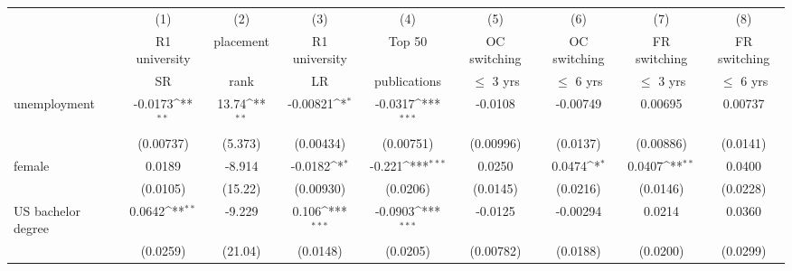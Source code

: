 \begin{table}[htbp]\centering
		\def\sym#1{\ifmmode^{#1}\else\(^{#1}\)\fi}
	\begin{adjustbox}{max width=1\textwidth}
\begin{tabular}{l*{8}{c}}
\hline\hline
            &\multicolumn{1}{c}{(1)}&\multicolumn{1}{c}{(2)}&\multicolumn{1}{c}{(3)}&\multicolumn{1}{c}{(4)}&\multicolumn{1}{c}{(5)}&\multicolumn{1}{c}{(6)}&\multicolumn{1}{c}{(7)}&\multicolumn{1}{c}{(8)}\\
            &\multicolumn{1}{c}{R1 university}&\multicolumn{1}{c}{placement}&\multicolumn{1}{c}{R1 university}&\multicolumn{1}{c}{Top 50}&\multicolumn{1}{c}{OC switching}&\multicolumn{1}{c}{OC switching}&\multicolumn{1}{c}{FR switching}&\multicolumn{1}{c}{FR switching}\\
            &\multicolumn{1}{c}{SR}&\multicolumn{1}{c}{rank}&\multicolumn{1}{c}{LR}&\multicolumn{1}{c}{publications}&\multicolumn{1}{c}{$\le$ 3 yrs}&\multicolumn{1}{c}{$\le$ 6 yrs}&\multicolumn{1}{c}{$\le$ 3 yrs}&\multicolumn{1}{c}{$\le$ 6 yrs}\\
\hline
unemployment    &     -0.0173\sym{**} &       13.74\sym{**} &    -0.00821\sym{*}  &     -0.0317\sym{***}&     -0.0108         &    -0.00749         &     0.00695         &     0.00737         \\
            &   (0.00737)         &     (5.373)         &   (0.00434)         &   (0.00751)         &   (0.00996)         &    (0.0137)         &   (0.00886)         &    (0.0141)         \\
[1em]
female &      0.0189         &      -8.914         &     -0.0182\sym{*}  &      -0.221\sym{***}&      0.0250         &      0.0474\sym{*}  &      0.0407\sym{**} &      0.0400         \\
            &    (0.0105)         &     (15.22)         &   (0.00930)         &    (0.0206)         &    (0.0145)         &    (0.0216)         &    (0.0146)         &    (0.0228)         \\
[1em]
US bachelor degree   &      0.0642\sym{**} &      -9.229         &       0.106\sym{***}&     -0.0903\sym{***}&     -0.0125         &    -0.00294         &      0.0214         &      0.0360         \\
            &    (0.0259)         &     (21.04)         &    (0.0148)         &    (0.0205)         &   (0.00782)         &    (0.0188)         &    (0.0200)         &    (0.0299)         \\

\end{tabular}
\end{adjustbox}
\end{table}
